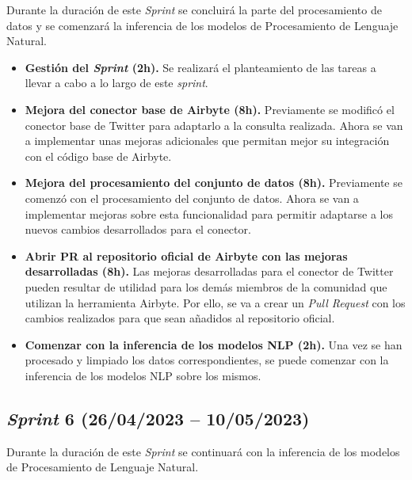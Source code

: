 Durante la duración de este \textit{Sprint} se concluirá la parte del procesamiento de datos y se comenzará la inferencia de los modelos de Procesamiento de Lenguaje Natural.

\begin{itemize}

    \item \textbf{Gestión del \textit{Sprint} (2h).} Se realizará el planteamiento de las tareas a llevar a cabo a lo largo de este \textit{sprint}.

    \item \textbf{Mejora del conector base de Airbyte (8h).} Previamente se modificó el conector base de Twitter para adaptarlo a la consulta realizada. Ahora se van a implementar unas mejoras adicionales que permitan mejor su integración con el código base de Airbyte.

    \item \textbf{Mejora del procesamiento del conjunto de datos (8h).} Previamente se comenzó con el procesamiento del conjunto de datos. Ahora se van a implementar mejoras sobre esta funcionalidad para permitir adaptarse a los nuevos cambios desarrollados para el conector.

    \item \textbf{Abrir PR al repositorio oficial de Airbyte con las mejoras desarrolladas (8h).} Las mejoras desarrolladas para el conector de Twitter pueden resultar de utilidad para los demás miembros de la comunidad que utilizan la herramienta Airbyte. Por ello, se va a crear un \textit{Pull Request} con los cambios realizados para que sean añadidos al repositorio oficial.

    \item \textbf{Comenzar con la inferencia de los modelos NLP (2h).} Una vez se han procesado y limpiado los datos correspondientes, se puede comenzar con la inferencia de los modelos NLP sobre los mismos.

\end{itemize}




\subsection{\textit{Sprint} 6 (26/04/2023 -- 10/05/2023)}

Durante la duración de este \textit{Sprint} se continuará con la inferencia de los modelos de Procesamiento de Lenguaje Natural.

